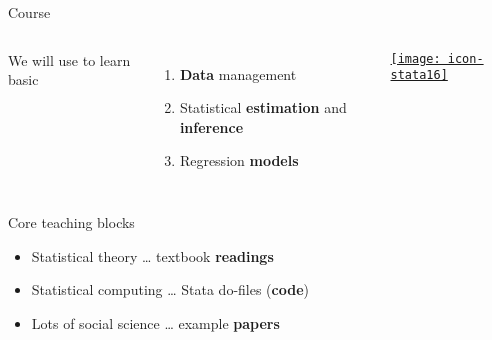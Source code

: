\documentclass[t]{beamer}
\begin{document}
  \begin{frame}[t]{Course }

    \begin{columns}[T]


      We will use \textbf{} to learn basic\\[1em]%

      \begin{enumerate}
        \item \textbf{Data} management
        \item Statistical \textbf{estimation} and \textbf{inference}
        \item Regression \textbf{models}
      \end{enumerate}


      \begin{center}
        \vspace{-2em}
        \href{http://www.stata.com/}{\texttt{[image: icon-stata16]}}
      \end{center}

    \end{columns}

      \vspace{1em}

      \begin{block}{Core teaching blocks}
        \begin{itemize}
          \item Statistical theory      \hfill … textbook \textbf{readings}
          \item Statistical computing   \hfill … Stata do-files (\textbf{code})
          \item Lots of social science  \hfill … example \textbf{papers}
        \end{itemize}
      \end{block}


  \end{frame}
\end{document}
